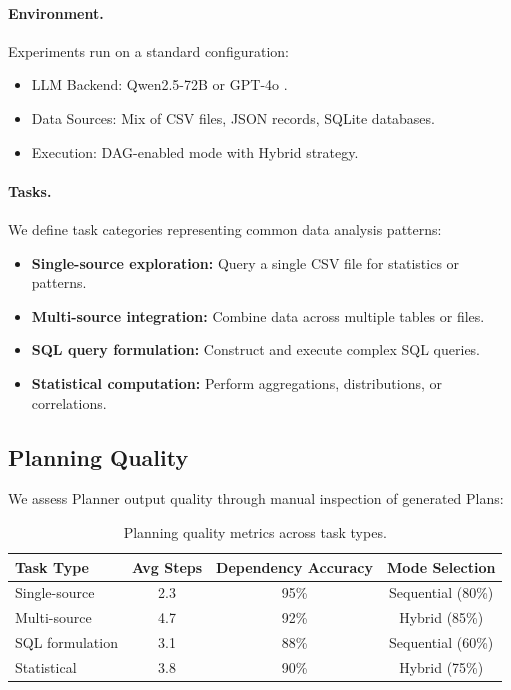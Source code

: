 \documentclass{article}
\theoremstyle{definition}
\begin{document}
\paragraph{Environment.}
Experiments run on a standard configuration:
\begin{itemize}[leftmargin=1.5em]
    \item LLM Backend: Qwen2.5-72B \cite{qwen2.5} or GPT-4o \cite{hurst2024gpt}.
    \item Data Sources: Mix of CSV files, JSON records, SQLite databases.
    \item Execution: DAG-enabled mode with Hybrid strategy.
\end{itemize}

\paragraph{Tasks.}
We define task categories representing common data analysis patterns:
\begin{itemize}[leftmargin=1.5em]
    \item \textbf{Single-source exploration:} Query a single CSV file for statistics or patterns.
    \item \textbf{Multi-source integration:} Combine data across multiple tables or files.
    \item \textbf{SQL query formulation:} Construct and execute complex SQL queries.
    \item \textbf{Statistical computation:} Perform aggregations, distributions, or correlations.
\end{itemize}

\subsection{Planning Quality}

We assess Planner output quality through manual inspection of generated Plans:

\begin{table}[t]
\centering
\caption{Planning quality metrics across task types.}
\label{tab:plan-quality}
\begin{tabular}{lccc}
\toprule
Task Type & Avg Steps & Dependency Accuracy & Mode Selection \\
\midrule
Single-source & 2.3 & 95\% & Sequential (80\%) \\
Multi-source & 4.7 & 92\% & Hybrid (85\%) \\
SQL formulation & 3.1 & 88\% & Sequential (60\%) \\
Statistical & 3.8 & 90\% & Hybrid (75\%) \\
\bottomrule
\end{tabular}
\end{table}
\end{document}
